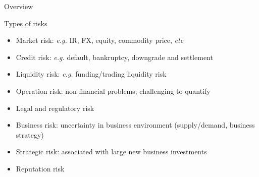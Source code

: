 \begin{frame}[allowframebreaks]{Overview}
\begin{block}{Types of risks}
	\begin{itemize}
		\item Market risk: \textit{e.g.} IR, FX, equity, commodity price, \textit{etc}
		\item Credit risk: \textit{e.g.} default, bankruptcy, downgrade and settlement
		\item Liquidity risk: \textit{e.g.} funding/trading liquidity risk
		\item Operation risk: non-financial problems; challenging to quantify
		\item Legal and regulatory risk
		\item Business risk: uncertainty in business environment (supply/demand, business strategy)
		\item Strategic risk: associated with large new business investments
		\item Reputation risk
	\end{itemize}
\end{block}

\end{frame}

